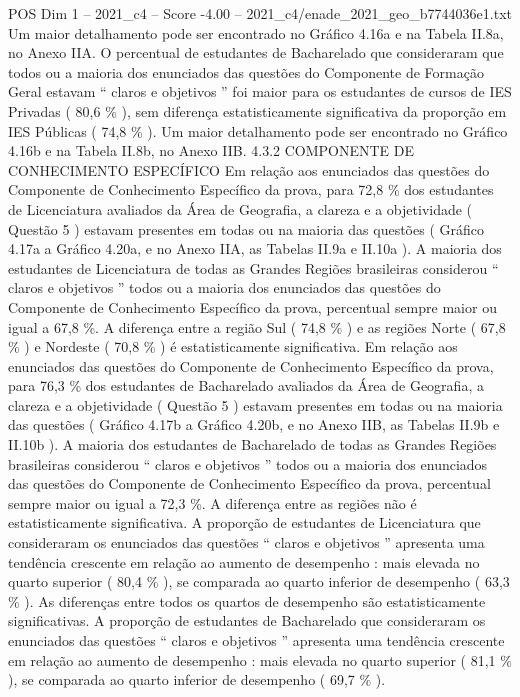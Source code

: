 \begin{textsample}{POS Dim 1 – 2021\_c4 – Score -4.00 – 2021\_c4/enade\_2021\_geo\_b7744036e1.txt}
Um maior detalhamento pode ser encontrado no Gráfico 4.16a e na Tabela II.8a, no Anexo IIA.
O percentual de estudantes de Bacharelado que consideraram que todos ou a maioria dos enunciados das questões do Componente de Formação Geral estavam “ claros e objetivos ” foi maior para os estudantes de cursos de IES Privadas ( 80,6 \% ), sem diferença estatisticamente significativa da proporção em IES Públicas ( 74,8 \% ).
Um maior detalhamento pode ser encontrado no Gráfico 4.16b e na Tabela II.8b, no Anexo IIB. 4.3.2 COMPONENTE DE CONHECIMENTO ESPECÍFICO Em relação aos enunciados das questões do Componente de Conhecimento Específico da prova, para 72,8 \% dos estudantes de Licenciatura avaliados da Área de Geografia, a clareza e a objetividade ( Questão 5 ) estavam presentes em todas ou na maioria das questões ( Gráfico 4.17a a Gráfico 4.20a, e no Anexo IIA, as Tabelas II.9a e II.10a ).
A maioria dos estudantes de Licenciatura de todas as Grandes Regiões brasileiras considerou “ claros e objetivos ” todos ou a maioria dos enunciados das questões do Componente de Conhecimento Específico da prova, percentual sempre maior ou igual a 67,8 \%.
A diferença entre a região Sul ( 74,8 \% ) e as regiões Norte ( 67,8 \% ) e Nordeste ( 70,8 \% ) é estatisticamente significativa.
Em relação aos enunciados das questões do Componente de Conhecimento Específico da prova, para 76,3 \% dos estudantes de Bacharelado avaliados da Área de Geografia, a clareza e a objetividade ( Questão 5 ) estavam presentes em todas ou na maioria das questões ( Gráfico 4.17b a Gráfico 4.20b, e no Anexo IIB, as Tabelas II.9b e II.10b ).
A maioria dos estudantes de Bacharelado de todas as Grandes Regiões brasileiras considerou “ claros e objetivos ” todos ou a maioria dos enunciados das questões do Componente de Conhecimento Específico da prova, percentual sempre maior ou igual a 72,3 \%.
A diferença entre as regiões não é estatisticamente significativa.
A proporção de estudantes de Licenciatura que consideraram os enunciados das questões “ claros e objetivos ” apresenta uma tendência crescente em relação ao aumento de desempenho : mais elevada no quarto superior ( 80,4 \% ), se comparada ao quarto inferior de desempenho ( 63,3 \% ).
As diferenças entre todos os quartos de desempenho são estatisticamente significativas.
A proporção de estudantes de Bacharelado que consideraram os enunciados das questões “ claros e objetivos ” apresenta uma tendência crescente em relação ao aumento de desempenho : mais elevada no quarto superior ( 81,1 \% ), se comparada ao quarto inferior de desempenho ( 69,7 \% ).

\end{textsample}
